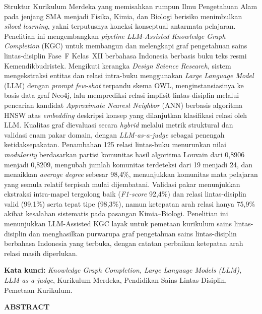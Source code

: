 \documentclass[../../thesis]{subfiles}
\begin{document}
\noindent Struktur Kurikulum Merdeka yang memisahkan rumpun Ilmu Pengetahuan
Alam pada jenjang SMA menjadi Fisika, Kimia, dan Biologi berisiko menimbulkan
\textit{siloed learning}, yakni terputusnya koneksi konseptual antarmata
pelajaran. Penelitian ini mengembangkan \textit{pipeline}
\textit{LLM-Assisted Knowledge Graph Completion} (KGC) untuk membangun dan
melengkapi graf pengetahuan sains lintas-disiplin Fase~F Kelas~XII berbahasa
Indonesia berbasis buku teks resmi Kemendikbudristek. Mengikuti kerangka
\textit{Design Science Research}, sistem mengekstraksi entitas dan relasi
intra-buku menggunakan \textit{Large Language Model} (LLM) dengan
\textit{prompt few-shot} terpandu skema OWL, menginstansiasinya ke
basis data graf Neo4j, lalu memprediksi relasi implisit lintas-disiplin melalui
pencarian kandidat \textit{Approximate Nearest Neighbor} (ANN) berbasis
algoritma HNSW atas \textit{embedding} deskripsi konsep yang dilanjutkan
klasifikasi relasi oleh LLM. Kualitas graf dievaluasi secara \textit{hybrid} melalui metrik struktural
dan validasi enam pakar domain, dengan \textit{LLM-as-a-judge} sebagai penengah
ketidaksepakatan. Penambahan 125 relasi lintas-buku menurunkan nilai
\textit{modularity} berdasarkan partisi komunitas hasil algoritma Louvain dari
0{,}8906 menjadi 0{,}8209, mengubah jumlah komunitas terdeteksi dari 19 menjadi
24, dan menaikkan \textit{average degree} sebesar 98{,}4\%, menunjukkan komunitas
mata pelajaran yang semula relatif terpisah mulai dijembatani. Validasi
pakar menunjukkan ekstraksi intra-mapel tergolong baik (\textit{F1-score} 92{,}4\%)
dan relasi lintas-disiplin valid (99{,}1\%) serta tepat tipe (98{,}3\%),
namun ketepatan arah relasi hanya 75{,}9\% akibat kesalahan sistematis pada
pasangan Kimia--Biologi. Penelitian ini menunjukkan LLM-Assisted KGC layak untuk
pemetaan kurikulum sains lintas-disiplin dan menghasilkan purwarupa graf
pengetahuan sains lintas-disiplin berbahasa Indonesia yang terbuka, dengan
catatan perbaikan ketepatan arah relasi masih diperlukan.
\vspace{0.6cm}

\noindent\textbf{Kata kunci:} \textit{Knowledge Graph Completion, Large Language Models
(LLM), LLM-as-a-judge}, Kurikulum Merdeka, Pendidikan Sains Lintas-Disiplin,
Pemetaan Kurikulum.

\clearpage
{}
{}
\begin{center}\bfseries ABSTRACT\end{center}
\thispagestyle{plain}
\vspace{0.6cm}
\singlespacing
{}
\vspace{0.6cm}
\end{document}
